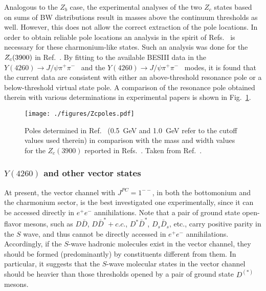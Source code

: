 Analogous to the $Z_b$ case, the experimental analyses of the two $Z_c$ states
based on sums of BW distributions result in masses above the continuum thresholds as
well. However, this does not allow the correct extraction of the pole locations.
In order to obtain reliable pole locations  an analysis in the spirit of
Refs.~\cite{Hanhart:2015cua,Guo:2016bjq} is necessary for these charmonium-like
states. Such an analysis was done for the $Z_c(3900)$ in
Ref.~\cite{Albaladejo:2015lob}. By fitting to the available BESIII data in the
$Y(4260)\to J/\psi\pi^+\pi^-$~\cite{Ablikim:2013mio} and the $Y(4260)\to
J/\psi\pi^+\pi^-$~\cite{Ablikim:2015swa} modes, it is found that the current
data are consistent with either an above-threshold resonance pole or a
below-threshold virtual state pole. A comparison of the resonance pole obtained
therein with various determinations in experimental papers is shown in
Fig.~\ref{fig:Zcpole}.
\begin{figure}[tb]
\begin{center}
  \texttt{[image: ./figures/Zcpoles.pdf]}
 \caption{Poles determined in Ref.~\cite{Albaladejo:2015lob} (0.5~GeV and
 1.0~GeV refer to the cutoff values used therein) in comparison with the mass
 and width values for the $Z_c(3900)$ reported in Refs.~\cite{Ablikim:2013mio, 
 Ablikim:2013xfr, Ablikim:2015swa, Liu:2013dau, Xiao:2013iha}. Taken from
 Ref.~\cite{Albaladejo:2015lob}.
 }
 \label{fig:Zcpole}
\end{center}
\end{figure}






\subsubsection{$Y(4260)$ and other vector states}\label{sec:Y(4260)}

At present, the vector channel with $J^{PC}=1^{--}$, in both the bottomonium and
the charmonium sector, is the best investigated one experimentally, since it can
be accessed directly in $e^+e^-$ annihilations.
Note that a pair of ground state open-flavor mesons, such as $D\bar{D}$,
$D\bar{D}^*+c.c.$, $D^*\bar{D}^*$, $D_s\bar{D}_s$, etc., carry positive parity
in the $S$ wave, and thus cannot be directly accessed in $e^+e^-$ 
annihilations. 
Accordingly, if the $S$-wave hadronic molecules exist in the vector channel,
they should be formed (predominantly) by constituents different from them. In 
particular,
it suggests that the $S$-wave molecular states in the vector channel should be
heavier than those thresholds opened by a pair of ground state $D^{(*)}$ mesons.



